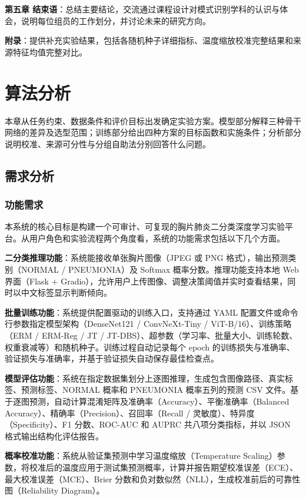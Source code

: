 \documentclass[12pt,a4paper,UTF8,openany]{ctexbook}
\begin{document}
\textbf{第五章 结束语}：总结主要结论，交流通过课程设计对模式识别学科的认识与体会，说明每位组员的工作划分，并讨论未来的研究方向。\vspace{0.5cm}

\textbf{附录}：提供补充实验结果，包括各随机种子详细指标、温度缩放校准完整结果和来源特征均值完整对比。

\chapter{算法分析}

本章从任务约束、数据条件和评价目标出发确定实验方案。模型部分解释三种骨干网络的差异及选型范围；训练部分给出四种方案的目标函数和实施条件；分析部分说明校准、来源可分性与分组自助法分别回答什么问题。

\section{需求分析}

\subsection{功能需求}

本系统的核心目标是构建一个可审计、可复现的胸片肺炎二分类深度学习实验平台。从用户角色和实验流程两个角度看，系统的功能需求包括以下几个方面。

\textbf{二分类推理功能}：系统能接收单张胸片图像（JPEG 或 PNG 格式），输出预测类别（NORMAL / PNEUMONIA）及 Softmax 概率分数。推理功能支持本地 Web 界面（Flask + Gradio），允许用户上传图像、调整决策阈值并实时查看结果，同时以中文标签显示判断倾向。

\textbf{批量训练功能}：系统提供配置驱动的训练入口，支持通过 YAML 配置文件或命令行参数指定模型架构（DenseNet121 / ConvNeXt-Tiny / ViT-B/16）、训练策略（ERM / ERM-Reg / JT / JT-DBS）、超参数（学习率、批量大小、训练轮数、权重衰减等）和随机种子。训练过程自动记录每个 epoch 的训练损失与准确率、验证损失与准确率，并基于验证损失自动保存最佳检查点。

\textbf{模型评估功能}：系统在指定数据集划分上逐图推理，生成包含图像路径、真实标签、预测标签、NORMAL 概率和 PNEUMONIA 概率五列的预测 CSV 文件。基于逐图预测，自动计算混淆矩阵及准确率（Accuracy）、平衡准确率（Balanced Accuracy）、精确率（Precision）、召回率（Recall / 灵敏度）、特异度（Specificity）、F1 分数、ROC-AUC 和 AUPRC 共八项分类指标，并以 JSON 格式输出结构化评估报告。

\textbf{概率校准功能}：系统从验证集预测中学习温度缩放（Temperature Scaling）参数，将校准后的温度应用于测试集预测概率，计算并报告期望校准误差（ECE）、最大校准误差（MCE）、Brier 分数和负对数似然（NLL），生成校准前后的可靠性图（Reliability Diagram）。
\end{document}
